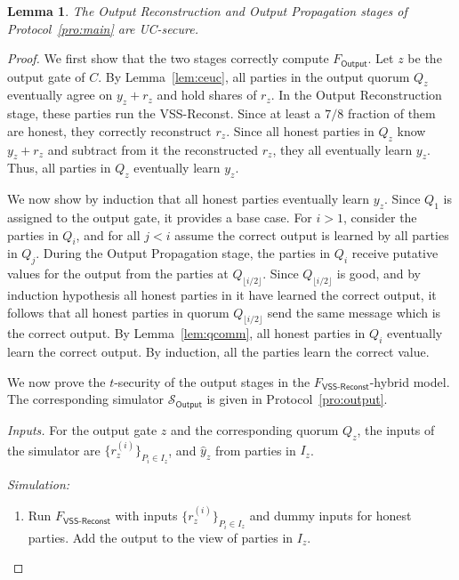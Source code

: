 \documentclass[11pt,letter]{article}
\newcommand{\func}[1]{\mbox{$F_\textsf{#1}$}}
\newcommand{\simu}[1]{\mbox{$\mathcal{S}_\textsf{#1}$}}
\newcommand{\mask}[1]{\widehat{#1}}
\theoremstyle{mytheoremstyle}
\newtheorem{lemma}{Lemma}
\let\savedCaption=\caption
\renewcommand*{\caption}[1]{\savedCaption[#1]{~#1}}
\newcommand{\algfont}{}
\newcommand{\fgoodq}{7/8\xspace}
\newcommand{\vssRec}{\textsf{VSS-Reconst}\xspace}
\begin{document}
\begin{lemma}
	The Output Reconstruction and Output Propagation stages of Protocol~\ref{pro:main} are UC-secure.
\label{lem:outputuc}	
\end{lemma}
\begin{proof}
	We first show that the two stages correctly compute \func{Output}. Let $z$ be the output gate of $C$. By Lemma~\ref{lem:ceuc}, all parties in the output quorum $Q_z$ eventually agree on $y_z + r_z$ and hold shares of $r_z$. In the Output Reconstruction stage, these parties run the \vssRec. Since at least a $\fgoodq$ fraction of them are honest, they correctly reconstruct $r_z$. Since all honest parties in $Q_z$ know $y_z + r_z$ and subtract from it the reconstructed $r_z$, they all eventually learn $y_z$. Thus, all parties in $Q_z$ eventually learn $y_z$.

	We now show by induction that all honest parties eventually learn $y_z$. Since $Q_1$ is assigned to the output gate, it provides a base case. For $i > 1$, consider the parties in $Q_i$, and for all $j < i$ assume the correct output is learned by all parties in $Q_j$. During the Output Propagation stage, the parties in $Q_i$ receive putative values for the output from the parties at $Q_{\lfloor i/2 \rfloor}$. Since $Q_{\lfloor i/2 \rfloor}$ is good, and by induction hypothesis all honest parties in it have learned the correct output, it follows that all honest parties in quorum $Q_{\lfloor i/2 \rfloor}$ send the same message which is the correct output. By Lemma~\ref{lem:qcomm}, all honest parties in $Q_i$ eventually learn the correct output. By induction, all the parties learn the correct value.
	
	We now prove the $t$-security of the output stages in the \func{VSS-Reconst}-hybrid model. The corresponding simulator \simu{Output} is given in Protocol~\ref{pro:output}.		
	\begin{algorithm}
		\algfont
		\caption{\simu{Output}}
		\label{pro:output}
		\smallskip
		\textit{Inputs.} For the output gate $z$ and the corresponding quorum $Q_z$, the inputs of the simulator are $\{r_z^{(i)}\}_{P_i\in I_z}$, and $\mask{y}_z$ from parties in $I_z$. \medskip
		
		\textit{Simulation:}
		
		\begin{enumerate}
			\item Run \func{VSS-Reconst} with inputs  $\{r_z^{(i)}\}_{P_i\in I_z}$ and dummy inputs for honest parties. Add the output to the view of parties in $I_z$.
		 

\end{enumerate}
\end{algorithm}
\end{proof}
\end{document}
